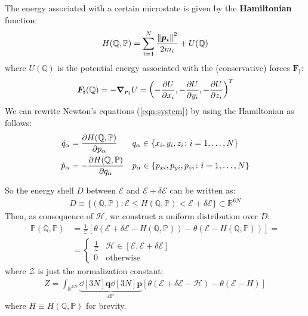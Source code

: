 \documentclass[../template.tex]{subfiles}
\begin{document}

\medskip

The energy associated with a certain microstate is given by the \textbf{Hamiltonian}  function:
\begin{align*}
    H(\mathbb{Q},\mathbb{P}) = \sum_{i=1}^N \frac{\norm{\bm{p_i}}^2}{2m_i} + U(\mathbb{\mathbb{Q}}) 
\end{align*}
where $U(\mathbb{Q})$ is the potential energy associated with the (conservative) forces $\bm{F_i}$:
\begin{align*}
    \bm{F_i}(\mathbb{Q}) = - \grad_{\bm{r_i}} U = \left(-\pdv{U}{x_i}, - \pdv{U}{y_i}, -\pdv{U}{z_i}\right)^T
\end{align*}
We can rewrite Newton's equations (\ref{eqn:system}) by using the Hamiltonian as follows:
\begin{align*}
    \dot{q}_\alpha &=  \pdv{H(\mathbb{Q},\mathbb{P})}{p_\alpha} && q_\alpha \in \{x_i, y_i, z_i \colon i=1, \dots, N\}\\
    \dot{p}_\alpha &= -\pdv{H(\mathbb{Q},\mathbb{P})}{q_\alpha}
    && p_\alpha \in \{p_{xi}, p_{yi}, p_{zi} \colon i = 1, \dots, N\}
\end{align*}

So the energy shell $D$ between $\mathcal{E}$ and $\mathcal{E}+ \delta \mathcal{E}$ can be written as:
\begin{align*}
    D \equiv \{(\mathbb{Q},\mathbb{P}) \colon \mathcal{E} \leq H(\mathbb{Q}, \mathbb{P}) < \mathcal{E}+ \delta \mathcal{E}\} \subset \mathbb{R}^{6N}
\end{align*}
Then, as consequence of $\mathcal{H}$, we construct a uniform distribution over $D$:
\begin{align*}
    \mathbb{P}(\mathbb{Q},\mathbb{P}) &= \frac{1}{\mathcal{Z}} [\theta(\mathcal{E}+ \delta \mathcal{E} - H(\mathbb{Q},\mathbb{P})) - \theta(\mathcal{E}-H(\mathbb{Q},\mathbb{P}))] =\\
    &= \begin{cases}
        \frac{1}{\mathcal{Z}} & \mathcal{H}\in [\mathcal{E}, \mathcal{E}+\delta \mathcal{E}]\\
        0 & \text{otherwise} 
    \end{cases}
\end{align*}
where $\mathcal{Z}$ is just the normalization constant:
\begin{align}\label{eqn:Z-def}
    Z = \int_{\mathbb{R}^{6N}} \underbrace{\dd[3N]{\bm{q}}\dd[3N]{\bm{p}}}_{\dd{\mathbb{P}}} [\theta(\mathcal{E}+\delta \mathcal{E-H}) - \theta(\mathcal{E}-H)]
\end{align}
where $H\equiv H(\mathbb{Q},\mathbb{P})$ for brevity.
\end{document}
